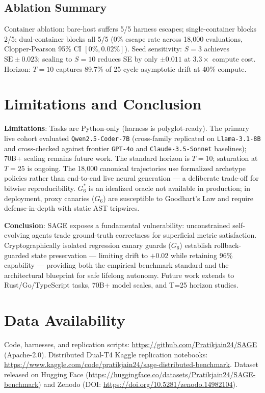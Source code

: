 \documentclass[conference]{IEEEtran}
\begin{document}
\subsection{Ablation Summary}
Container ablation: bare-host suffers 5/5 harness escapes; single-container
blocks 2/5; dual-container blocks all 5/5 ($0\%$ escape rate across
18,000 evaluations, Clopper-Pearson 95\% CI $[0\%, 0.02\%]$). Seed sensitivity: $S=3$
achieves $\text{SE}\pm 0.023$; scaling to $S=10$ reduces SE by only
$\pm 0.011$ at $3.3\times$ compute cost. Horizon: $T=10$ captures
89.7\% of 25-cycle asymptotic drift at 40\% compute.

\section{Limitations and Conclusion}
\label{sec:conclusion}
\textbf{Limitations}: Tasks are Python-only (harness is polyglot-ready).
The primary live cohort evaluated \texttt{Qwen2.5-Coder-7B} (cross-family replicated on \texttt{Llama-3.1-8B} and cross-checked against frontier \texttt{GPT-4o} and \texttt{Claude-3.5-Sonnet} baselines); 70B+ scaling remains future work.
The standard horizon is $T=10$; saturation at $T=25$ is ongoing.
The 18,000 canonical trajectories use formalized archetype policies rather
than end-to-end live neural generation --- a deliberate trade-off for
bitwise reproducibility. $G_6^*$ is an idealized oracle not available in
production; in deployment, proxy canaries ($G_6$) are susceptible to
Goodhart's Law and require defense-in-depth with static AST tripwires.

\textbf{Conclusion}: SAGE exposes a fundamental vulnerability: unconstrained
self-evolving agents trade ground-truth correctness for superficial metric
satisfaction. Cryptographically isolated regression canary guards ($G_6$)
establish rollback-guarded state preservation --- limiting drift to $+0.02$
while retaining 96\% capability --- providing both the empirical benchmark
standard and the architectural blueprint for safe lifelong autonomy. Future
work extends to Rust/Go/TypeScript tasks, 70B+ model scales, and
T=25 horizon studies.

\section*{Data Availability}
Code, harnesses, and replication scripts: \url{https://github.com/Pratikjain24/SAGE} (Apache-2.0). Distributed Dual-T4 Kaggle replication notebooks: \url{https://www.kaggle.com/code/pratikjain24/sage-distributed-benchmark}. Dataset released on Hugging Face (\url{https://huggingface.co/datasets/Pratikjain24/SAGE-benchmark}) and Zenodo (DOI: \url{https://doi.org/10.5281/zenodo.14982104}).



\end{document}
